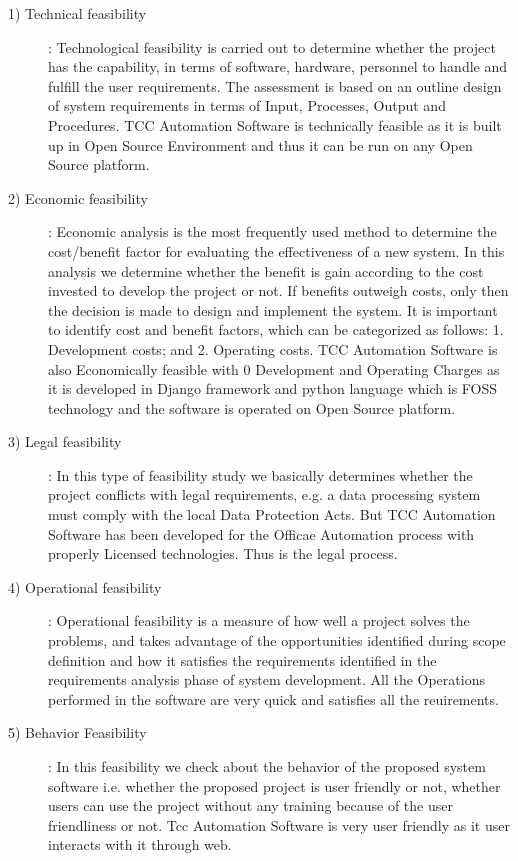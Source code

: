 \begin{description}
\item[1) Technical feasibility] : Technological feasibility is carried out to determine whether the project has the capability, in terms of software, hardware, personnel to handle and fulfill the user requirements. The assessment is based on an outline design of system requirements in terms of Input, Processes, Output and Procedures. TCC Automation Software is technically feasible as it is built up in Open Source Environment and thus it can be run on any Open Source platform.
\item[2) Economic feasibility] : Economic analysis is the most frequently used method to determine the cost/benefit factor for evaluating the effectiveness of a new system. In this analysis we determine whether the benefit is gain according to the cost invested to develop the project or not. If benefits outweigh costs, only then the decision is made to design and implement the system. It is important to identify cost and
benefit factors, which can be categorized as follows:
1. Development costs; and
2. Operating costs.
TCC Automation Software is also Economically feasible with 0 Development and Operating Charges as it is developed in Django framework and python language which is FOSS technology and the software is operated on Open Source platform.
\item[3) Legal feasibility] : In this type of feasibility study we basically determines whether the project conflicts with legal requirements, e.g. a data processing system must comply with the local Data Protection Acts. But TCC Automation Software has been developed for the Officae Automation process with properly Licensed technologies. Thus is the legal process.
\item[4) Operational feasibility] : Operational feasibility is a measure of how well a project solves the problems, and takes advantage of the opportunities identified during scope definition and how it satisfies the requirements identified in the requirements analysis phase of system development. All the Operations performed in the software are very quick and satisfies all the reuirements.
\item[5) Behavior Feasibility] : In this feasibility we check about the behavior of the proposed system software i.e. whether the proposed project is user friendly or not, whether users can use the project without any training because of the user friendliness or not.
Tcc Automation Software is very user friendly as it user interacts with it through web.
\end{description}

